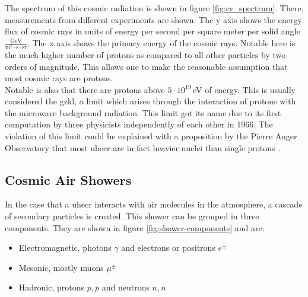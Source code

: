 \documentclass[abstract,toc,los,english,11pt,glossaries]{jluthesis}
\begin{document}
The spectrum of this cosmic radiation is shown in figure \ref{fig:cr_spectrum}. There, measurements from different experiments are shown. The y axis shows the energy flux of cosmic rays in units of energy per second per square meter per solid angle $\frac{\text{GeV}}{\text{m}^2\cdot\text{s}\cdot\text{sr}}$. The x axis shows the primary energy of the cosmic rays. Notable here is the much higher number of protons as compared to all other particles by two orders of magnitude. This allows one to make the reasonable assumption that most cosmic rays are protons. \\
Notable is also that there are protons above $5\cdot10^{19}$\,eV of energy.
This is usually considered the \acrfull{gzkl}\cite{2021APh...12602526B}, a limit which arises through the interaction of protons with the microwave background radiation. This limit got its name due to its first computation by three physicists independently of each other in 1966. The violation of this limit could be explained with a proposition by the Pierre Auger Observatory that most \acrshort{uhecr} are in fact heavier nuclei than single protons \cite{thepierreaugercollaboration2017inferences}.

\clearpage
\subsection{Cosmic Air Showers}
In the case that a \acrshort{uhecr} interacts with air molecules in the atmosphere, a cascade of secondary particles is created. This shower can be grouped in three components. They are shown in figure \ref{fig:shower-components} and are:
\begin{itemize}
	\item Electromagnetic, photons $\gamma$ and electrons or positrons $e^\pm$
	\item Mesonic, mostly muons $\mu^\pm$
	\item Hadronic, protons $p,\bar{p}$ and neutrons $n,\bar{n}$
\end{itemize}
\end{document}
